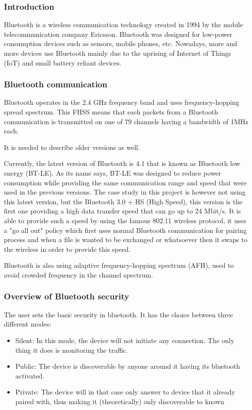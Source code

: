 \subsubsection{Introduction}
Bluetooth is a wireless communication technology created in 1994 by the mobile telecommunication company Ericsson. Bluetooth was designed for low-power consumption devices such as sensors, mobile phones, etc. Nowadays, more and more devices use Bluetooth mainly due to the uprising of Internet of Things (IoT) and small battery reliant devices.

\subsubsection{Bluetooth communication}
Bluetooth operates in the 2.4 GHz frequency band and uses frequency-hopping spread spectrum. This FHSS means that each packets from a Bluetooth communication is transmitted on one of 79 channels having a bandwidth of 1MHz each. 

It is needed to describe older versions as well.

Currently, the latest version of Bluetooth is 4.1 that is known as Bluetooth low energy (BT-LE). As its name says, BT-LE was designed to reduce power consumption while providing the same communication range and speed that were used in the previous versions. 
The case study in this project is however not using this latest version, but the Bluetooth 3.0 + HS (High Speed), this version is  the first one providing a high data transfer speed that can go up to 24 Mbit/s. It is able to provide such a speed by using the famous 802.11 wireless protocol, it uses a "go all out" policy which first uses normal Bluetooth communication for pairing process and when a file is wanted to be exchanged or whatsoever then it swaps to the wireless in order to provide this speed.

Bluetooth is also using adaptive frequency-hopping spectrum (AFH), used to avoid crowded frequency in the channel spectrum.

\subsubsection{Overview of Bluetooth security}
The user sets the basic security in bluetooth. It has the choice between three different modes:
 \begin{itemize}
 	\item Silent: In this mode, the device will not initiate any connection. The only thing it does is monitoring the traffic.
 	\item Public: The device is discoverable by anyone around it having its bluetooth activated.
 	\item Private: The device will in that case only answer to device that it already paired with, thus making it (theoretically) only discoverable to known 
 \end{itemize}

